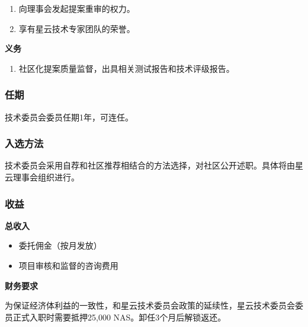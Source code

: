 \begin{enumerate}
	\item 向理事会发起提案重审的权力。
	\item 享有星云技术专家团队的荣誉。
\end{enumerate}

\textbf{义务}

\begin{enumerate}
	\item 社区化提案质量监督，出具相关测试报告和技术评级报告。
\end{enumerate}

\subsubsection{任期}

技术委员会委员任期1年，可连任。

\subsubsection{入选方法}

技术委员会采用自荐和社区推荐相结合的方法选择，对社区公开述职。具体将由星云理事会组织进行。

\subsubsection{收益}

\textbf{总收入}

\begin{itemize}
	\item 委托佣金（按月发放）
	\item 项目审核和监督的咨询费用
\end{itemize}

\vspace{2em}

\textbf{财务要求}

为保证经济体利益的一致性，和星云技术委员会政策的延续性，星云技术委员会委员正式入职时需要抵押25,000 NAS。卸任3个月后解锁返还。